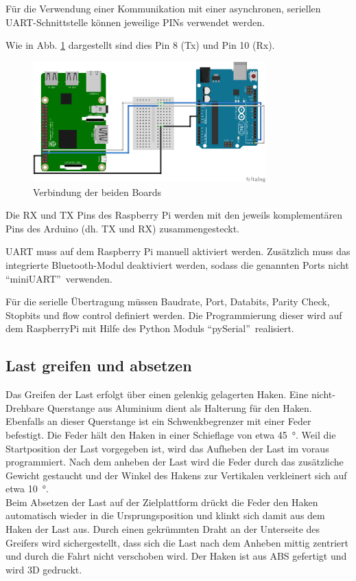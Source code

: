 \documentclass[a4paper]{report}
\begin{document}
Für die Verwendung einer Kommunikation mit einer asynchronen, seriellen UART-Schnittstelle können jeweilige PINs verwendet werden.

Wie in Abb. \ref{fig:RaspberryPins} dargestellt sind dies Pin 8 (Tx) und Pin 10 (Rx).
\begin{figure}[h!]
	\centering
	\includegraphics[keepaspectratio, width=0.8\textwidth]{UART_Verbindung_LLS_Steckplatine}
	\caption{Verbindung der beiden Boards}
	\label{fig:RaspberryPins}
\end{figure}

Die RX und TX Pins des Raspberry Pi werden mit den jeweils komplementären Pins des Arduino (dh. TX und RX) zusammengesteckt.

UART muss auf dem Raspberry Pi manuell aktiviert werden.  Zusätzlich muss das integrierte Bluetooth-Modul deaktiviert werden, sodass die genannten Ports nicht \textquotedblleft miniUART\textquotedblright\ verwenden.

Für die serielle Übertragung müssen Baudrate, Port, Databits, Parity Check, Stopbits und flow control definiert werden. Die Programm\-ierung dieser wird auf dem RaspberryPi mit Hilfe des Python Moduls \textquotedblleft pySerial\textquotedblright\ realisiert.

\newpage

\subsection{Last greifen und absetzen}
Das Greifen der Last erfolgt über einen gelenkig gelagerten Haken.  Eine nicht-Drehbare Querstange aus Aluminium dient als Halterung für den Haken. Ebenfalls an dieser Querstange ist ein Schwenkbegrenzer mit einer Feder befestigt. Die Feder hält den Haken in einer Schieflage von etwa 45\SI{}{\degree}. Weil die Startposition der Last vorgegeben ist, wird das Aufheben der Last im voraus programmiert.
Nach dem anheben der Last wird die Feder durch das zusätzliche Gewicht gestaucht und der Winkel des Hakens zur Vertikalen verkleinert sich auf etwa 10\SI{}{\degree}.\\
Beim Absetzen der Last auf der Zielplattform drückt die Feder den Haken automatisch wieder in die Ursprungsposition und klinkt sich damit aus dem Haken der Last aus.
Durch einen gekrümmten Draht an der Unterseite des Greifers wird sichergestellt, dass sich die Last nach dem Anheben mittig zentriert und durch die Fahrt nicht verschoben wird. %
Der Haken ist aus ABS gefertigt und wird 3D gedruckt.
\end{document}
